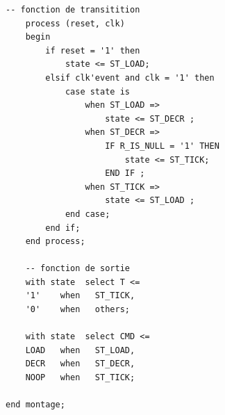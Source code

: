 \documentclass[10pt]{article}
\begin{document}
\begin{lstlisting}[style=vhdl]
    -- fonction de transitition    
	process (reset, clk)
	begin
		if reset = '1' then
			state <= ST_LOAD;
		elsif clk'event and clk = '1' then
			case state is
				when ST_LOAD =>
					state <= ST_DECR ;
				when ST_DECR =>
					IF R_IS_NULL = '1' THEN
						state <= ST_TICK;
					END IF ;
				when ST_TICK =>
					state <= ST_LOAD ;
			end case;
		end if;
	end process;

    -- fonction de sortie    
	with state  select T <=
	'1'    when   ST_TICK,
	'0'    when   others;

	with state  select CMD <=
	LOAD   when   ST_LOAD,
	DECR   when   ST_DECR,
	NOOP   when   ST_TICK;

end montage;


\end{lstlisting}
\end{document}
